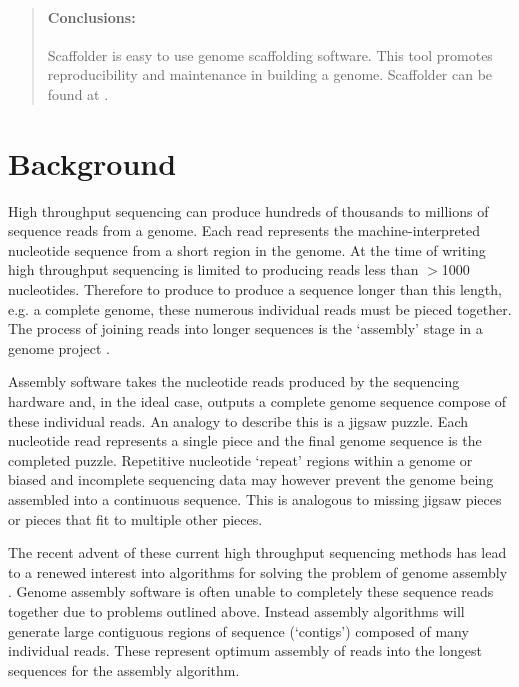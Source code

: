 \documentclass[10pt]{bmc_article}
\newenvironment{bmcformat}{\begin{raggedright}\baselineskip20pt\sloppy\setboolean{publ}{false}}{\end{raggedright}\baselineskip20pt\sloppy}
\begin{document}
\begin{bmcformat}
\begin{abstract}
  \paragraph*{Conclusions:} Scaffolder is easy to use genome scaffolding
  software. This tool promotes reproducibility and maintenance in building
  a genome. Scaffolder can be found at \scaffolder.

\end{abstract}


\clearpage

\section*{Background} %

High throughput sequencing can produce hundreds of thousands to millions of
sequence reads from a genome. Each read represents the machine-interpreted
nucleotide sequence from a short region in the genome. At the time of writing
high throughput sequencing is limited to producing reads less than $>$1000
nucleotides. Therefore to produce to produce a sequence longer than this
length, e.g. a complete genome, these numerous individual reads must be pieced
together. The process of joining reads into longer sequences is the `assembly'
stage in a genome project \cite{assembly-reviews}. \pb

Assembly software takes the nucleotide reads produced by the sequencing
hardware and, in the ideal case, outputs a complete genome sequence compose of
these individual reads. An analogy to describe this is a jigsaw puzzle. Each
nucleotide read represents a single piece and the final genome sequence is the
completed puzzle. Repetitive nucleotide `repeat' regions within a genome or
biased and incomplete sequencing data may however prevent the genome being
assembled into a continuous sequence. This is analogous to missing jigsaw
pieces or pieces that fit to multiple other pieces. \pb

The recent advent of these current high throughput sequencing methods has lead
to a renewed interest into algorithms for solving the problem of genome
assembly \cite{assembly-reviews}. Genome assembly software is often unable to
completely these sequence reads together due to problems outlined above.
Instead assembly algorithms will generate large contiguous regions of sequence
(`contigs') composed of many individual reads. These represent optimum assembly
of reads into the longest sequences for the assembly algorithm. \pb


\end{bmcformat}
\end{document}
